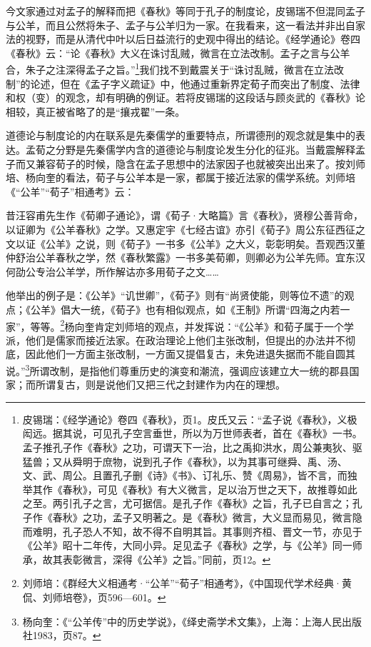 \documentclass[a4paper, 12pt, openright]{ctexbook}
\renewenvironment{quote}
  {\list{}{\rightmargin2\ccwd \leftmargin2\ccwd \itemindent=2\ccwd \listparindent=2\ccwd}%
   \item\relax\small\kaishu\color{black}}
  {\endlist}
\begin{document}
今文家通过对孟子的解释而把《春秋》等同于孔子的制度论，皮锡瑞不但混同孟子与公羊，而且公然将朱子、孟子与公羊归为一家。在我看来，这一看法并非出自家法的视野，而是从清代中叶以后日益流行的史观中得出的结论。《经学通论》卷四《春秋》云：“论《春秋》大义在诛讨乱贼，微言在立法改制。孟子之言与公羊合，朱子之注深得孟子之旨。”\footnote{皮锡瑞：《经学通论》卷四《春秋》，页1。皮氏又云：“孟子说《春秋》，义极闳远。据其说，可见孔子空言垂世，所以为万世师表者，首在《春秋》一书。孟子推孔子作《春秋》之功，可谓天下一治，比之禹抑洪水，周公兼夷狄、驱猛兽；又从舜明于庶物，说到孔子作《春秋》，以为其事可继舜、禹、汤、文、武、周公。且置孔子删《诗》《书》、订礼乐、赞《周易》，皆不言，而独举其作《春秋》，可见《春秋》有大义微言，足以治万世之天下，故推尊如此之至。两引孔子之言，尤可据信。是孔子作《春秋》之旨，孔子已自言之；孔子作《春秋》之功，孟子又明著之。是《春秋》微言，大义显而易见，微言隐而难明，孔子恐人不知，故不得不自明其旨。其事则齐桓、晋文一节，亦见于《公羊》昭十二年传，大同小异。足见孟子《春秋》之学，与《公羊》同一师承，故其表彰微言，深得《公羊》之旨。”同前，页12。}我们找不到戴震关于“诛讨乱贼，微言在立法改制”的论述，但在《孟子字义疏证》中，他通过重新界定荀子而突出了制度、法律和权（变）的观念，却有明确的例证。若将皮锡瑞的这段话与顾炎武的《春秋》论相较，真正被省略了的是“攘戎翟”一条。

道德论与制度论的内在联系是先秦儒学的重要特点，所谓德刑的观念就是集中的表达。孟荀之分野是先秦儒学内含的道德论与制度论发生分化的征兆。当戴震解释孟子而又兼容荀子的时候，隐含在孟子思想中的法家因子也就被突出出来了。按刘师培、杨向奎的看法，荀子与公羊本是一家，都属于接近法家的儒学系统。刘师培《“公羊”“荀子”相通考》云：

\begin{quote}
昔汪容甫先生作《荀卿子通论》，谓《荀子·大略篇》言《春秋》，贤穆公善背命，以证卿为《公羊春秋》之学。又惠定宇《七经古谊》亦引《荀子》周公东征西征之文以证《公羊》之说，则《荀子》一书多《公羊》之大义，彰彰明矣。吾观西汉董仲舒治公羊春秋之学，然《春秋繁露》一书多美荀卿，则卿必为公羊先师。宜东汉何劭公专治公羊学，所作解诂亦多用荀子之文……
\end{quote}

他举出的例子是：《公羊》“讥世卿”，《荀子》则有“尚贤使能，则等位不遗”的观点；《公羊》倡大一统，《荀子》也有相似观点，如《王制》所谓“四海之内若一家”，等等。\footnote{刘师培：《群经大义相通考·“公羊”“荀子”相通考》，《中国现代学术经典·黄侃、刘师培卷》，页596—601。}杨向奎肯定刘师培的观点，并发挥说：“《公羊》和荀子属于一个学派，他们是儒家而接近法家。在政治理论上他们主张改制，但提出的办法并不彻底，因此他们一方面主张改制，一方面又提倡复古，未免进退失据而不能自圆其说。”\footnote{杨向奎：《“公羊传”中的历史学说》，《绎史斋学术文集》，上海：上海人民出版社1983，页87。}所谓改制，是指他们尊重历史的演变和潮流，强调应该建立大一统的郡县国家；而所谓复古，则是说他们又把三代之封建作为内在的理想。
\end{document}

